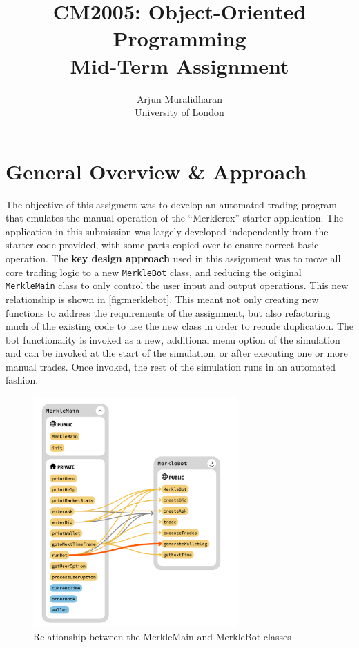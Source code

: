 
\title{CM2005: Object-Oriented Programming \\ Mid-Term Assignment}
\author{Arjun Muralidharan \\ University of London}



\section{General Overview \& Approach}
The objective of this assigment was to develop an automated trading program that emulates the manual operation of the ``Merklerex'' starter application. The application in this submission was largely developed independently from the starter code provided, with some parts copied over to ensure correct basic operation.
The \textbf{key design approach} used in this assignment was to move all core trading logic to a new \texttt{MerkleBot} class, and reducing the original \texttt{MerkleMain} class to only control the user input and output operations. This new relationship is shown in \autoref{fig:merklebot}.
This meant not only creating new functions to address the requirements of the assignment, but also refactoring much of the existing code to use the new class in order to recude duplication.
The bot functionality is invoked as a new, additional menu option of the simulation and can be invoked at the start of the simulation, or after executing one or more manual trades. Once invoked, the rest of the simulation runs in an automated fashion.

\begin{figure}[H]
	\centering
	\includegraphics[width=0.7\textwidth]{merklemainbot.png}
	\caption{Relationship between the MerkleMain and MerkleBot classes}
	\label{fig:merklebot}
\end{figure}

